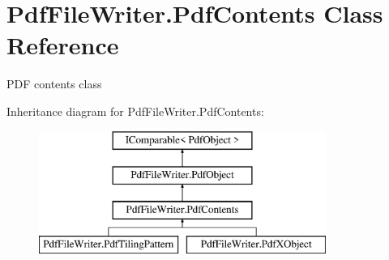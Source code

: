 \hypertarget{class_pdf_file_writer_1_1_pdf_contents}{}\section{Pdf\+File\+Writer.\+Pdf\+Contents Class Reference}
\label{class_pdf_file_writer_1_1_pdf_contents}


P\+DF contents class  


Inheritance diagram for Pdf\+File\+Writer.\+Pdf\+Contents\+:\begin{figure}[H]
\begin{center}
\leavevmode
\includegraphics[height=4.000000cm]{class_pdf_file_writer_1_1_pdf_contents}
\end{center}
\end{figure}
